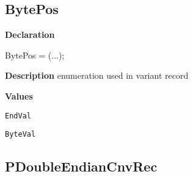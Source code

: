 \documentclass{report}
\newif\ifpdf
\begin{document}
\subsection*{BytePos}
\fi
\label{ok_complicated_record-BytePos}
\begin{list}{}{
\setlength{\itemindent}{0cm}
\setlength{\listparindent}{0cm}
\setlength{\leftmargin}{\evensidemargin}
\addtolength{\leftmargin}{\tmplength}
\settowidth{\labelsep}{X}
\addtolength{\leftmargin}{\labelsep}
\setlength{\labelwidth}{\tmplength}
}
\item[\textbf{Declaration}\hfill]
\ifpdf
\begin{flushleft}
\fi
\begin{ttfamily}
BytePos = (...);\end{ttfamily}

\ifpdf
\end{flushleft}
\fi

\par
\item[\textbf{Description}]
enumeration used in variant record\item[\textbf{Values}]
\begin{description}
\item[\texttt{EndVal}] \label{ok_complicated_record-EndVal}
\index{}
 
\item[\texttt{ByteVal}] \label{ok_complicated_record-ByteVal}
\index{}
 
\end{description}


\end{list}
\ifpdf
\subsection*{\large{\textbf{PDoubleEndianCnvRec}}\normalsize\hspace{1ex}\hrulefill}
\else
\end{document}
